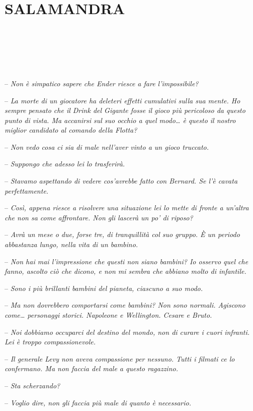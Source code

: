 \chapter{SALAMANDRA}

{~}

{~}

{~}

{-- \emph{Non è simpatico sapere che Ender riesce a fare
		l'impossibile?}}

{-- \emph{La morte di un giocatore ha deleteri effetti cumulativi sulla
		sua mente. Ho sempre pensato che il Drink del Gigante fosse il gioco più
		pericoloso da questo punto di vista. Ma accanirsi sul suo occhio a quel
		modo\ldots{} è questo il nostro miglior candidato al comando della
		Flotta?}}

{-- \emph{Non vedo cosa ci sia di male nell'aver vinto a un gioco
		truccato.}}

{-- \emph{Suppongo che adesso lei lo trasferirà.}}

{-- \emph{Stavamo aspettando di vedere cos'avrebbe fatto con Bernard. Se
		l'è cavata perfettamente.}}

{-- \emph{Così, appena riesce a risolvere una situazione lei lo mette di
		fronte a un'altra che non sa come affrontare. Non gli lascerà un po' di
		riposo?}}

{-- \emph{Avrà un mese o due, forse tre, di tranquillità col suo gruppo.
		È un periodo abbastanza lungo, nella vita di un bambino.}}

{-- \emph{Non hai mai l'impressione che questi non siano bambini? Io
		osservo quel che fanno, ascolto ciò che dicono, e non mi sembra che
		abbiano molto di infantile.}}

{-- \emph{Sono i più brillanti bambini del pianeta, ciascuno a suo
		modo.}}

{-- \emph{Ma non dovrebbero comportarsi come bambini? Non sono normali.
		Agiscono come\ldots{} personaggi storici. Napoleone e Wellington. Cesare
		e Bruto.}}

{-- \emph{Noi dobbiamo occuparci del destino del mondo, non di curare i
		cuori infranti. Lei è troppo compassionevole.}}

{-- \emph{Il generale Levy non aveva compassione per nessuno. Tutti i
		filmati ce lo confermano. Ma non faccia del male a questo ragazzino.}}

{-- \emph{Sta scherzando?}}

{-- \emph{Voglio dire, non gli faccia più male di quanto è necessario.}}

